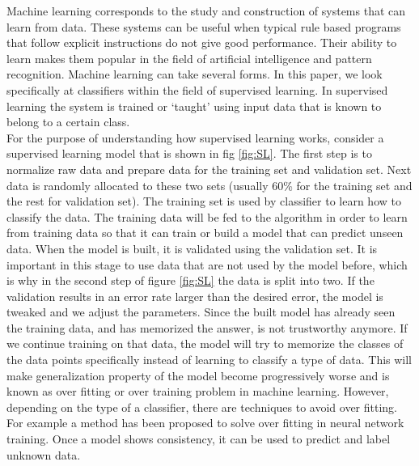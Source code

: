 Machine learning corresponds to the study and construction of systems that can learn from data. These systems can be useful when typical rule based programs that follow explicit instructions do not give good performance. Their ability to learn makes them popular in the field of artificial intelligence and pattern recognition. Machine learning can take several forms. In this paper, we look specifically at classifiers within the field of supervised learning. In supervised learning the system is trained or `taught' using input data that is known to belong to a certain class.\\ 

For the purpose of understanding how supervised learning works, consider a supervised learning model that is shown in fig \ref{fig:SL}. The first step is to normalize raw data and prepare data for the training set and validation set. Next data is randomly allocated to these two sets (usually $60$\% for the training set and the rest for validation set). The training set is used by classifier to learn how to classify the data. The training data will be fed to the algorithm in order to learn from training data so that it can train or build a model that can predict unseen data. When the model is built, it is validated using the validation set. It is important in this stage to use data that are not used by the model before, which is why in the second step of figure \ref{fig:SL} the data is split into two. If the validation results in an error rate larger than the desired error, the model is tweaked and we adjust the parameters. Since the built model has already seen the training data, and has memorized the answer, is not trustworthy anymore. If we continue training on that data, the model will try to memorize the classes of the data points specifically instead of learning to classify a type of data. This will make generalization property of the model become progressively worse and is known as over fitting or over training \cite{hawkins2004problem} problem in machine learning. However, depending on the type of a classifier, there are techniques to avoid over fitting. For example a method \cite{Piotrowski201397} has been proposed to solve over fitting in neural network training. Once a model shows consistency, it can be used to predict and label unknown data. \\  
 
